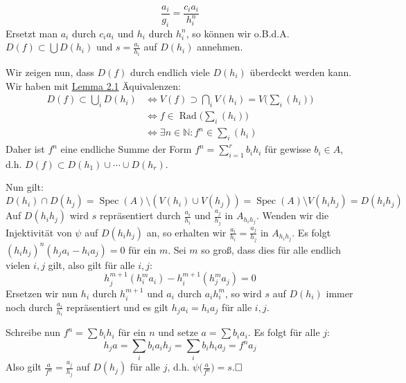 \documentclass[11pt,b5paper,openany]{memoir}
\def \qed {$\hfill\square$}
\begin{document}
\begin{enumerate}[(i)]
\begin{itemize}
\[\frac{a_i}{g_i}=\frac{c_ia_i}{h_i^n}\]
Ersetzt man $a_i$ durch $c_ia_i$ und $h_i$ durch $h_i^n$, so können wir o.B.d.A. $D(f)\subset\bigcup D(h_i)$ und $s=\frac{a_i}{h_i}$ auf $D(h_i)$ annehmen.

Wir zeigen nun, dass $D(f)$ durch endlich viele $D(h_i)$ überdeckt werden kann. Wir haben mit \hyperref[2.1]{Lemma 2.1} Äquivalenzen:
\begin{align*}
D(f)\subset \bigcup_{i}D(h_i) &\iff V(f)\supset\bigcap_i V(h_i) = V\Big(\sum_i (h_i)\Big)\\
&\iff f\in\operatorname{Rad}\Big(\sum_i (h_i)\Big)\\
&\iff \exists n\in\mathbb{N}\colon f^n\in\sum_i (h_i)
\end{align*}
Daher ist $f^n$ eine endliche Summe der Form $f^n=\sum_{i=1}^r b_ih_i$ für gewisse $b_i\in A$, d.h. $D(f)\subset D(h_1)\cup\cdots\cup D(h_r)$.

Nun gilt: \[D(h_i)\cap D(h_j)=\operatorname{Spec}(A)\setminus (V(h_i)\cup V(h_j))=\operatorname{Spec}(A)\setminus V(h_ih_j)=D(h_ih_j)\]
Auf $D(h_ih_j)$ wird $s$ repräsentiert durch $\frac{a_i}{h_i}$ und $\frac{a_j}{h_j}$ in $A_{h_ih_j}$. Wenden wir die Injektivität von $\psi$ auf $D(h_ih_j)$ an, so erhalten wir $\frac{a_i}{h_i}=\frac{a_j}{h_j}$ in $A_{h_ih_j}$. Es folgt $(h_ih_j)^n(h_ja_i-h_ia_j)=0$ für ein $m$. Sei $m$ so groß, dass dies für alle endlich vielen $i,j$ gilt, also gilt für alle $i,j$:
\[h_j^{m+1}(h_i^ma_i)-h_i^{m+1}(h_j^ma_j)=0 \]
Ersetzen wir nun $h_i$ durch $h_i^{m+1}$ und $a_i$ durch $a_ih_i^m$, so wird $s$ auf $D(h_i)$ immer noch durch $\frac{a_i}{h_i}$ repräsentiert und es gilt $h_ja_i=h_ia_j$ für alle $i,j$. 

Schreibe nun $f^n=\sum b_ih_i$ für ein $n$ und setze $a=\sum b_ia_i$. Es folgt für alle $j$:
\[h_ja = \sum_i b_ia_ih_j=\sum _i b_ih_ia_j=f^na_j \]
Also gilt $\frac{a}{f^n}=\frac{a_j}{h_j}$ auf $D(h_j)$ für alle $j$, d.h. $\psi\big(\frac{a}{f^n}\big)=s$.\qed
\end{itemize}
\end{enumerate}
\end{document}
